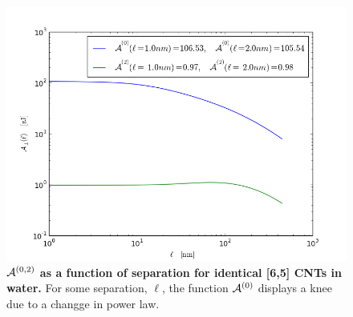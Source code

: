 \documentclass[a4paper]{article}
\begin{document}
\begin{center}
\begin{figure}[t!]
\begin{center}
\includegraphics[width=1.2\textwidth]{plots/140322_65w65_HCs_perpendicular_ret.png}
\hskip 43pt
\caption{{\bf ${\cal A}^{(0,2)}$ as a function of separation for identical [6,5]
    CNTs in water.} For some separation, $\ell$, the function ${\cal A}^{(0)}$
displays a knee due to a changge in power law.}
\label{eiz65}
\end{center}
\end{figure} 

\hskip 73pt


\end{center}
\end{document}
